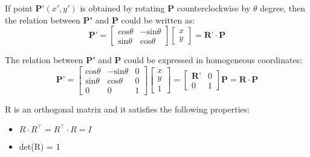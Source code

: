 If point $\textbf{P'}(x', y')$ is obtained by rotating \textbf{P} counterclockwise by $\theta$ degree, then the relation between \textbf{P'} and \textbf{P} could be written as:\\
$$\textbf{P'} = \left[\begin{array}{cc} \text{cos}\theta & -\text{sin}\theta \\ \text{sin}\theta & \text{cos}\theta\end{array}\right]\left[\begin{array}{c} x \\ y \end{array}\right] = \textbf{R'} \cdot \textbf{P}$$

The relation between \textbf{P'} and \textbf{P} could be expressed in homogeneous coordinates:
$$\textbf{P'}= \left[\begin{array}{ccc} \text{cos}\theta & -\text{sin}\theta & 0 \\ \text{sin}\theta & \text{cos}\theta & 0 \\ 0 & 0 & 1 \end{array}\right] \left[\begin{array}{c} x \\ y \\ 1 \end{array}\right] = \left[\begin{array}{rr} \textbf{R'} & 0 \\ 0 & 1 \end{array}\right] \textbf{P} = \textbf{R} \cdot \textbf{P}$$  
\begin{tcolorbox}
R is an orthogonal matrix and it satisfies the following properties:
\begin{itemize}
    \item $R \cdot R^\top = R^\top \cdot R = I$
    \item det(R) = 1
\end{itemize}
\end{tcolorbox}

